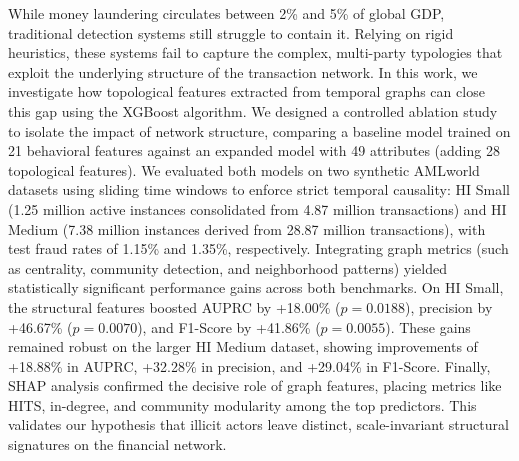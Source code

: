 \documentclass[a4paper,12pt,oneside,onecolumn,final,fleqn]{repUERJ}
\begin{document}
\imprimirchaves %
%
%

While money laundering circulates between 2\% and 5\% of global GDP, traditional detection systems still struggle to contain it. Relying on rigid heuristics, these systems fail to capture the complex, multi-party typologies that exploit the underlying structure of the transaction network. In this work, we investigate how topological features extracted from temporal graphs can close this gap using the XGBoost algorithm. We designed a controlled ablation study to isolate the impact of network structure, comparing a baseline model trained on 21 behavioral features against an expanded model with 49 attributes (adding 28 topological features). We evaluated both models on two synthetic AMLworld datasets using sliding time windows to enforce strict temporal causality: HI Small (1.25 million active instances consolidated from 4.87 million transactions) and HI Medium (7.38 million instances derived from 28.87 million transactions), with test fraud rates of 1.15\% and 1.35\%, respectively. Integrating graph metrics (such as centrality, community detection, and neighborhood patterns) yielded statistically significant performance gains across both benchmarks. On HI Small, the structural features boosted AUPRC by +18.00\% ($p=0.0188$), precision by +46.67\% ($p=0.0070$), and F1-Score by +41.86\% ($p=0.0055$). These gains remained robust on the larger HI Medium dataset, showing improvements of +18.88\% in AUPRC, +32.28\% in precision, and +29.04\% in F1-Score. Finally, SHAP analysis confirmed the decisive role of graph features, placing metrics like HITS, in-degree, and community modularity among the top predictors. This validates our hypothesis that illicit actors leave distinct, scale-invariant structural signatures on the financial network.\\

\printkeys %
%
%
\listadefiguras
\end{document}
